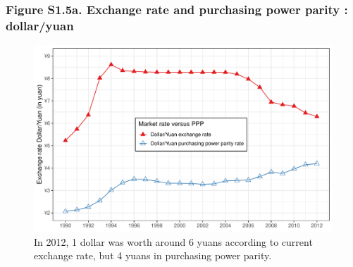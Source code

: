 \documentclass[t]{beamer}\usepackage[]{graphicx}\usepackage[]{color}
\newenvironment{knitrout}{}{} %
\begin{document}
\begin{frame}[label=Figure_S1_5a,fragile]
\frametitle{Figure S1.5a. Exchange rate and purchasing power parity : dollar/yuan}
\begin{figure}[t]
\begin{minipage}[b]{\textwidth}
\centering
\begin{knitrout}\footnotesize
{}\color{fgcolor}

{\centering \includegraphics[width=1\linewidth]{figures/color/Figure_S1_5a} 

}



\end{knitrout}
\caption{In 2012, 1 dollar was worth around 6 yuans according to current exchange rate, but 4 yuans in purchasing power parity.}
\end{minipage}
\end{figure}
\end{frame}
\end{document}
